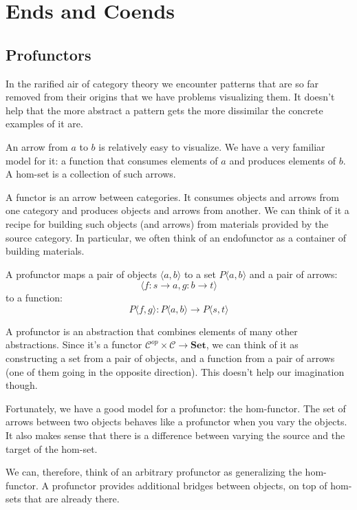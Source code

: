 \documentclass[DaoFP]{subfiles}
\begin{document}
\setcounter{chapter}{18}

\chapter{Ends and Coends}

\section{Profunctors}

In the rarified air of category theory we encounter patterns that are so far removed from their origins that we have problems visualizing them. It doesn't help that the more abstract a pattern gets the more dissimilar the concrete examples of it are. 

An arrow from $a$ to $b$ is relatively easy to visualize. We have a very familiar model for it: a function that consumes elements of $a$ and produces elements of $b$. A hom-set is a collection of such arrows. 

A functor is an arrow between categories. It consumes objects and arrows from one category and produces objects and arrows from another. We can think of it a recipe for building such objects (and arrows) from materials provided by the source category. In particular, we  often think of an endofunctor as a container of building materials.

A profunctor maps a pair of objects $\langle a, b \rangle$ to a set $P\langle a, b \rangle$ and a pair of arrows:
\[ \langle f \colon s \to a, g \colon b \to t \rangle \]
to a function:
\[ P\langle f, g \rangle \colon P\langle a, b \rangle \to P\langle s, t \rangle\]

A profunctor is an abstraction that combines elements of many other abstractions. Since it's a functor $ \mathcal{C}^{op} \times  \mathcal{C} \to \mathbf{Set}$, we can think of it as constructing a set from a pair of objects, and a function from a pair of arrows (one of them going in the opposite direction). This doesn't help our imagination though.

Fortunately, we have a good model for a profunctor: the hom-functor. The set of arrows between two objects behaves like a profunctor when you vary the objects. It also makes sense that there is a difference between varying the source and the target of the hom-set. 

We can, therefore, think of an arbitrary profunctor as generalizing the hom-functor. A profunctor provides additional bridges between objects, on top of hom-sets that are already there. 
\end{document}
